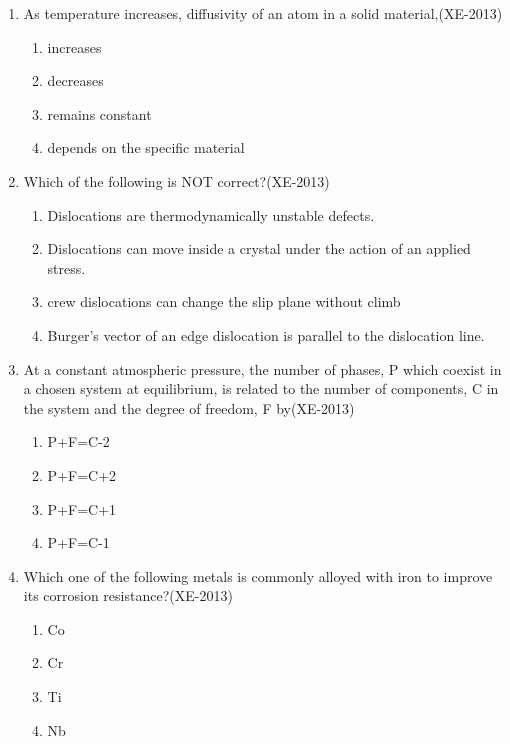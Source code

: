 \documentclass[journal]{IEEEtran}
\numberwithin{equation}{enumi}
\numberwithin{figure}{enumi}
\begin{document}
\begin{enumerate}
    

\item As temperature increases, diffusivity of an atom in a solid material,\hfill(XE-2013)
\begin{enumerate}
    \item increases
    \item decreases
    \item remains constant
    \item depends on the specific material
\end{enumerate}
\item Which of the following is NOT correct?\hfill(XE-2013)
\begin{enumerate}
    \item Dislocations are thermodynamically unstable defects.
    \item Dislocations can move inside a crystal under the action of an applied stress.
    \item crew dislocations can change the slip plane without climb
    \item Burger's vector of an edge dislocation is parallel to the dislocation line.
    
\end{enumerate}
\item At a constant atmospheric pressure, the number of phases, P which coexist in a chosen system at equilibrium, is related to the number of components, C in the system and the degree of freedom, F
by\hfill(XE-2013)
\begin{enumerate}
    \item P+F=C-2
    \item P+F=C+2
    \item P+F=C+1
    \item P+F=C-1
\end{enumerate}
\item Which one of the following metals is commonly alloyed with iron to improve its corrosion resistance?\hfill(XE-2013)
\begin{enumerate}
    \item Co
    \item Cr
    \item Ti
    \item Nb
    

\end{enumerate}
\end{enumerate}
\end{document}
